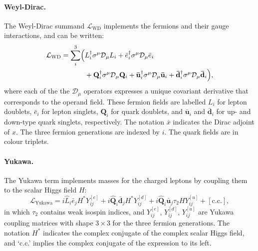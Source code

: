 \paragraph{Weyl-Dirac.}
The Weyl-Dirac summand $\mathcal{L}_\mathrm{WD}$ implements the fermions and
their gauge interactions, and can be written:
\begin{equation}
\begin{split}
\mathcal{L}_\mathrm{WD} =
\sum_i^3
\Bigl(
& L^\dagger_i \sigma^\mu \mathcal{D}_\mu L_i
+ \bar e^\dagger_i \sigma^\mu \mathcal{D}_\mu \bar e_i \\
& + \mathbf{Q}^\dagger_i \sigma^\mu \mathcal{D}_\mu \mathbf{Q}_i
+ \mathbf{\bar u}^\dagger_i \sigma^\mu \mathcal{D}_\mu \mathbf{\bar u}_i
+ \mathbf{\bar d}^\dagger_i \sigma^\mu \mathcal{D}_\mu \mathbf{\bar d}_i
\Bigr)
,
\end{split}
\end{equation}
where each of the the $\mathcal{D}_\mu$ operators expresses a unique covariant
derivative that corresponds to the operand field.
These fermion fields are labelled
$L_i$ for lepton doublets,
$\bar e_i$ for lepton singlets,
$\mathbf{Q}_i$ for quark doublets,
and $\mathbf{\bar u}_i$ and $\mathbf{\bar d}_i$ for up- and down-type quark
singlets, respectively.
The notation $\bar x$ indicates the Dirac adjoint of $x$.
The three fermion generations are indexed by $i$.
The quark fields are in colour triplets.

\paragraph{Yukawa.}
The Yukawa term implements masses for the charged leptons by coupling
them to the scalar Higgs field $H$:
\begin{equation}
\mathcal{L}_\mathrm{Yukawa} =
i\hat L_i \bar e_j H^* Y^{[e]}_{ij}
+ i\mathbf{\widehat Q}_i \mathbf{\bar d}_j H^* Y^{[d]}_{ij}
+ i\mathbf{\widehat Q}_i \mathbf{\bar u}_j \tau_2 H Y^{[u]}_{ij}
+ [\textrm{c.c.}]
,
\end{equation}
in which $\tau_2$ contains weak isospin indices,
and $Y^{[e]}_{ij}$, $Y^{[d]}_{ij}$, $Y^{[u]}_{ij}$ are Yukawa coupling matrices
with shape $3\times3$ for the three fermion generations.
The notation $H^*$ indicates the complex conjugate of the complex scalar
Higgs field, and `c.c.' implies the complex conjugate of the expression to
its left.

